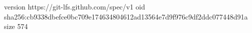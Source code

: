version https://git-lfs.github.com/spec/v1
oid sha256:cb9338dbefce0bc709e174634804612ad13564e7d9f976c9df2ddc077448d91a
size 574
